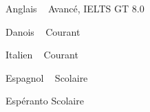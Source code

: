 


\begin{cvskills}

  \cvskill
    {Anglais ~ \emojiflagus} %
    {Avancé, IELTS GT 8.0} %

  \cvskill
    {Danois ~ \emojiflagdk} %
    {Courant} %

  \cvskill
    {Italien ~ \emojiflagit} %
    {Courant} %

  \cvskill
    {Espagnol ~ \emojiflages} %
    {Scolaire} %

  \cvskill
    {Espéranto} %
    {Scolaire} %

\end{cvskills}
